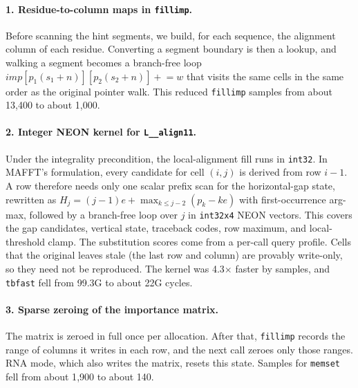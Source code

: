 \documentclass[11pt]{article}
\newcommand{\code}[1]{\texttt{#1}}
\begin{document}
\paragraph{1. Residue-to-column maps in \code{fillimp}.} Before scanning the hint segments,
we build, for each sequence, the alignment column of each residue. Converting a segment
boundary is then a lookup, and walking a segment becomes a branch-free loop
$\mathit{imp}[p_1(s_1{+}n)][p_2(s_2{+}n)] \mathrel{+}= w$ that visits the same cells in the
same order as the original pointer walk. This reduced \code{fillimp} samples from about
13{,}400 to about 1{,}000.

\paragraph{2. Integer NEON kernel for \code{L\_\_align11}.} Under the integrality
precondition, the local-alignment fill runs in \code{int32}. In MAFFT's formulation, every
candidate for cell $(i,j)$ is derived from row $i{-}1$. A row therefore needs only one
scalar prefix scan for the horizontal-gap state, rewritten as
$H_j = (j{-}1)e + \max_{k\le j-2}(p_k - k e)$ with first-occurrence arg-max, followed by a
branch-free loop over $j$ in \code{int32x4} NEON vectors. This covers the gap candidates,
vertical state, traceback codes, row maximum, and local-threshold clamp. The substitution
scores come from a per-call query profile. Cells that the original leaves stale (the last
row and column) are provably write-only, so they need not be reproduced. The kernel was
4.3$\times$ faster by samples, and \code{tbfast} fell from 99.3G to about 22G cycles.

\paragraph{3. Sparse zeroing of the importance matrix.} The matrix is zeroed in full once
per allocation. After that, \code{fillimp} records the range of columns it writes in each
row, and the next call zeroes only those ranges. RNA mode, which also writes the matrix,
resets this state. Samples for \code{memset} fell from about 1{,}900 to about 140.
\end{document}
